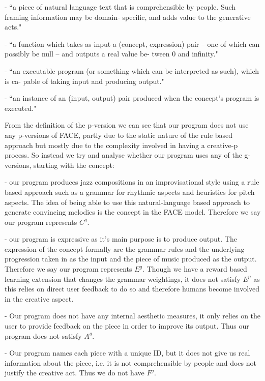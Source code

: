 \documentclass[pdftex,12pt,a4paper]{report}
\begin{document}
\begin{description} \itemsep1pt \parskip0pt  
  \item[Framing Information ] - ``a piece of natural language text that is comprehensible by people. Such framing information may be domain- specific, and adds value to the generative acts."
  \item[Aesthetic Measure] - ``a function which takes as input a (concept, expression) pair – one of which can possibly be null – and outputs a real value be- tween 0 and infinity."
  \item[Concept] - ``an executable program (or something which can be interpreted as such), which is ca- pable of taking input and producing output."
  \item[Expression of a Concept] - ``an instance of an (input, output) pair produced when the concept’s program is executed."
\end{description}

From the definition of the p-version we can see that our program does not use any p-versions of FACE, partly due to the static nature of the rule based approach but mostly due to the complexity involved in having a creative-p process. So instead we try and analyse whether our program uses any of the g-versions, starting with the concept:

\begin{description}  \itemsep1pt \parskip0pt  
  \item[Concept-g] - our program produces jazz compositions in an improvisational style using a rule based approach such as a grammar for rhythmic aspects and heuristics for pitch aspects. The idea of being able to use this natural-language based approach to generate convincing melodies is the concept in the FACE model. Therefore we say our program represents $C^{g}$.
  \item[Expression-g] - our program is expressive as it's main purpose is to produce output. The expression of the concept formally are the grammar rules and the underlying progression taken in as the input and the piece of music produced as the output. Therefore we say our program represents $E^{g}$. Though we have a reward based learning extension that changes the grammar weightings, it does not satisfy $E^{p}$ as this relies on direct user feedback to do so and therefore humans become involved in the creative aspect.
  \item[Aesthetics-g] - Our program does not have any internal aesthetic measures, it only relies on the user to provide feedback on the piece in order to improve its output. Thus our program does not satisfy $A^{g}$.
  \item[Framing-g] - Our program names each piece with a unique ID, but it does not give us real information about the piece, i.e. it is not comprehensible by people and does not justify the creative act. Thus we do not have $F^{g}$.
\end{description}
\end{document}
